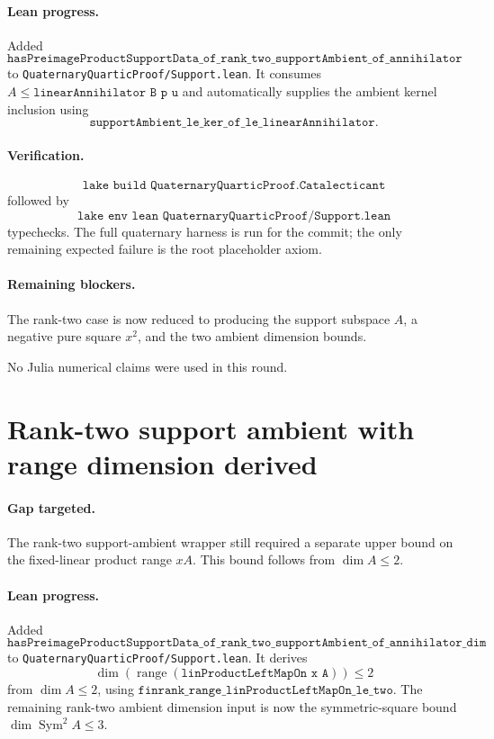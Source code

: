 \documentclass[11pt]{article}
\begin{document}
\paragraph{Lean progress.}
Added
\[
\texttt{hasPreimageProductSupportData\_of\_rank\_two\_supportAmbient\_of\_annihilator}
\]
to \texttt{QuaternaryQuarticProof/Support.lean}.  It consumes
\(A\le\texttt{linearAnnihilator B p u}\) and automatically supplies the ambient
kernel inclusion using
\[
\texttt{supportAmbient\_le\_ker\_of\_le\_linearAnnihilator}.
\]

\paragraph{Verification.}
\[
\texttt{lake build QuaternaryQuarticProof.Catalecticant}
\]
followed by
\[
\texttt{lake env lean QuaternaryQuarticProof/Support.lean}
\]
typechecks.  The full quaternary harness is run for the commit; the only
remaining expected failure is the root placeholder axiom.

\paragraph{Remaining blockers.}
The rank-two case is now reduced to producing the support subspace \(A\), a
negative pure square \(x^2\), and the two ambient dimension bounds.

No Julia numerical claims were used in this round.

\section*{Rank-two support ambient with range dimension derived}

\paragraph{Gap targeted.}
The rank-two support-ambient wrapper still required a separate upper bound on
the fixed-linear product range \(xA\).  This bound follows from
\(\dim A\le2\).

\paragraph{Lean progress.}
Added
\[
\texttt{hasPreimageProductSupportData\_of\_rank\_two\_supportAmbient\_of\_annihilator\_dim}
\]
to \texttt{QuaternaryQuarticProof/Support.lean}.  It derives
\[
\dim(\operatorname{range}(\texttt{linProductLeftMapOn x A}))\le2
\]
from \(\dim A\le2\), using
\(\texttt{finrank\_range\_linProductLeftMapOn\_le\_two}\).  The remaining
rank-two ambient dimension input is now the symmetric-square bound
\(\dim\operatorname{Sym}^2 A\le3\).
\end{document}

